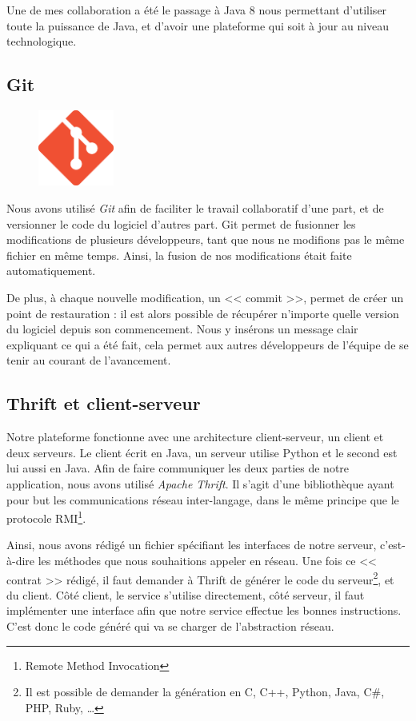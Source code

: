 Une de mes collaboration a été le passage à Java 8 nous permettant d'utiliser toute la puissance de Java, et d'avoir une plateforme qui soit à jour au niveau technologique.

\subsection{Git}
\begin{figure}
\vspace{-15px}
	\includegraphics[width=2.5cm]{contents/images/logoGit.png}
\end{figure}
Nous avons utilisé \textit{Git} afin de faciliter le travail collaboratif d'une part, et de versionner le code du logiciel d'autres part. Git permet de fusionner les
modifications de plusieurs développeurs, tant que nous ne modifions pas le même fichier en même temps. Ainsi, la fusion de nos modifications était faite automatiquement. 

De plus, à chaque nouvelle modification, un << commit >>, permet de créer un point de restauration : il est alors possible de
récupérer n'importe quelle version du logiciel depuis son commencement. Nous y insérons un message clair expliquant ce qui a été fait, cela permet aux autres développeurs de l'équipe de se tenir au courant de l'avancement.

\subsection{Thrift et client-serveur}\label{thrift}
Notre plateforme fonctionne avec une architecture client-serveur, un client et deux serveurs. Le client écrit en Java, un serveur utilise
Python et le second est lui aussi en Java. Afin de faire communiquer les deux parties de notre application, nous avons utilisé \textit{Apache Thrift}. Il s'agit d'une bibliothèque ayant pour but les communications réseau inter-langage, dans le même principe que le protocole RMI\footnote{Remote Method Invocation}.

Ainsi, nous avons rédigé un fichier spécifiant les interfaces de notre serveur, c'est-à-dire les méthodes que nous souhaitions appeler en réseau. Une fois ce << contrat >> rédigé, il faut demander à Thrift de générer le code du serveur\footnote{Il est possible de demander la génération en C, C++, Python, Java, C\#, PHP, Ruby, \ldots}, et du client. Côté client, le service s'utilise directement, côté serveur, il faut implémenter une interface afin que notre service effectue les bonnes instructions. C'est donc le code généré qui va se charger de l'abstraction réseau.

